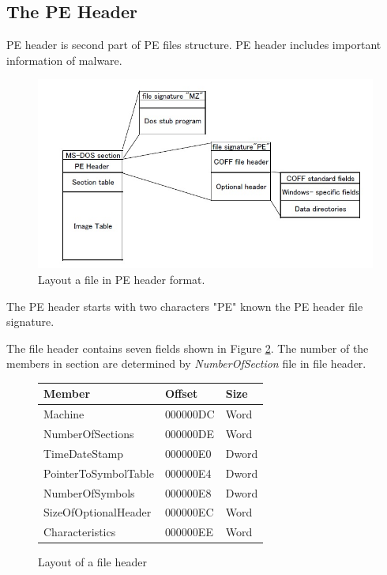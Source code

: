 \subsection{The PE Header}

PE header is second part of PE files structure. PE header includes important information of malware.
\begin{figure}[httb]
\centering
\includegraphics[width=1\textwidth]{graph/peheader1.jpg}
\caption{Layout a file in PE header format.}
\label{fig:peheader}
\end{figure}

The PE header starts with two characters "PE" known the PE header file signature.

The file header contains seven fields shown in Figure \ref{fig:fileheader}. The number of the members in section are determined by \emph{NumberOfSection} file in file header. 

\begin{figure}[h!]
\begin{center}
\begin{tabular}{ l | l | l }
Member & Offset & Size\\ \hline
Machine & 000000DC & Word\\ 
NumberOfSections & 000000DE & Word\\ 
TimeDateStamp & 000000E0 & Dword\\ 
PointerToSymbolTable & 000000E4 & Dword\\ 
NumberOfSymbols & 000000E8 & Dword\\ 
SizeOfOptionalHeader & 000000EC & Word\\ 
Characteristics & 000000EE & Word\\
\end{tabular}
\end{center}
\caption{Layout of a file header}
\label{fig:fileheader}
\end{figure}

